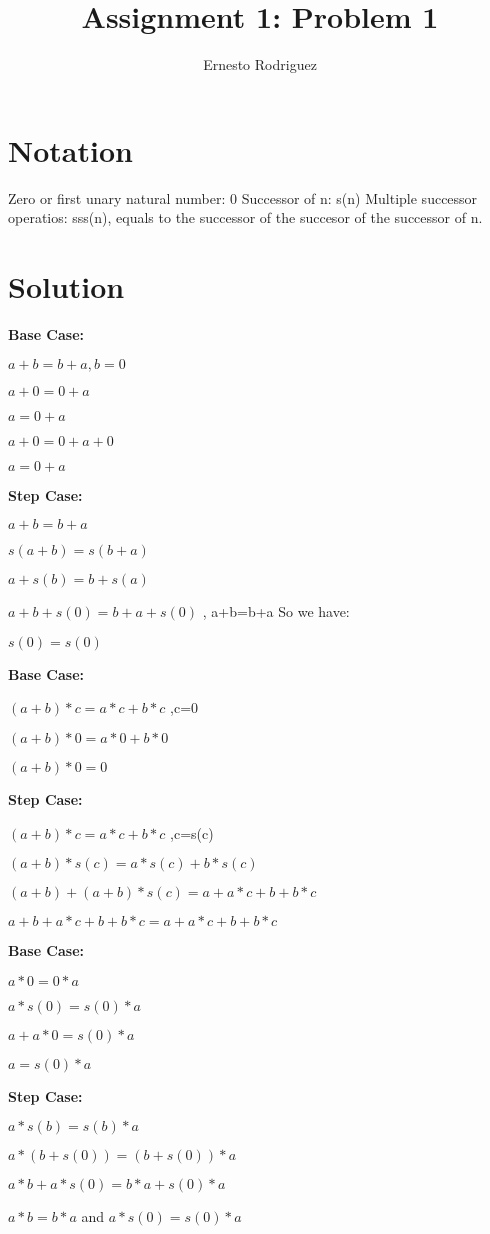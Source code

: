 \documentclass{article}
\title{Assignment 1: Problem 1}
\author{Ernesto Rodriguez}
\begin{document}
\maketitle

\section{Notation}

Zero or first unary natural number: 0
Successor of n: s(n)
Multiple successor operatios: sss(n), equals to the successor of the succesor of the successor of n.

\section{Solution}

\begin{enumerate}

  {\item {\bf Base Case:}

    $a + b = b + a, b=0$ 

    $a+0=0+a$ 

    $a=0+a$ 

    $a+0=0+a+0$

    $a=0+a$ 

    {\bf Step Case: }

    $a+b=b+a$

    $s(a+b)=s(b+a)$

    $a+s(b)=b+s(a)$

    $a+b+s(0)=b+a+s(0)$ , a+b=b+a So we have: 

    $s(0)=s(0)$
    }

  {\item {\bf Base Case:} 

    $(a+b) * c = a*c + b*c$ ,c=0

    $(a+b) * 0 = a*0 + b*0$

    $(a+b) * 0 = 0$

    {\bf Step Case:}

    $(a+b) * c = a*c + b*c$ ,c=s(c)

    $(a+b) * s(c) = a*s(c) + b*s(c)$

    $(a+b) + (a+b)*s(c) = a + a*c + b + b*c$

    $a+b+a*c+b+b*c=a+a*c+b+b*c$
    }

  {\item {\bf Base Case:}

    $a*0=0*a$

    $a*s(0)=s(0)*a$

    $a+a*0=s(0)*a$

    $a=s(0)*a$

    {\bf Step Case:}

    $a*s(b)=s(b)*a$

    $a*(b+s(0))=(b+s(0))*a$

    $a*b + a*s(0)=b*a +s(0)*a$

    $a*b=b*a$ and $a*s(0)=s(0)*a$
    
  }

  \end{enumerate}
\end{document}
